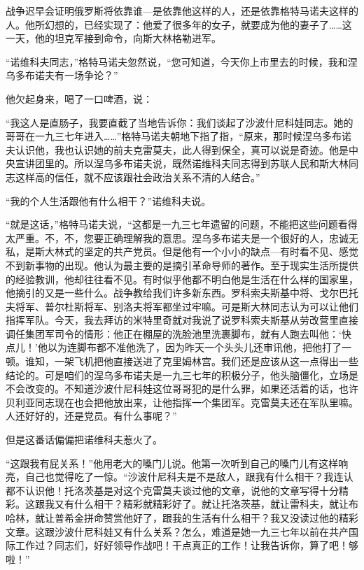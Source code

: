 战争迟早会证明俄罗斯将依靠谁—是依靠他这样的人，还是依靠格特马诺夫这样的人。他所幻想的，已经实现了：他爱了很多年的女子，就要成为他的妻子了……这一天，他的坦克军接到命令，向斯大林格勒进军。

“诺维科夫同志，”格特马诺夫忽然说，“您可知道，今天你上市里去的时候，我和涅乌多布诺夫有一场争论？”

他欠起身来，喝了一口啤酒，说：

“我这人是直肠子，我要直截了当地告诉你：我们谈起了沙波什尼科娃同志。她的哥哥在一九三七年进入……”格特马诺夫朝地下指了指，“原来，那时候涅乌多布诺夫认识他，我也认识她的前夫克雷莫夫，此人得到保全，真可以说是奇迹。他是中央宣讲团里的。所以涅乌多布诺夫说，既然诺维科夫同志得到苏联人民和斯大林同志这样高的信任，就不应该跟社会政治关系不清的人结合。”

“我的个人生活跟他有什么相干？”诺维科夫说。

“就是这话，”格特马诺夫说，“这都是一九三七年遗留的问题，不能把这些问题看得太严重。不，不，您要正确理解我的意思。涅乌多布诺夫是一个很好的人，忠诚无私，是斯大林式的坚定的共产党员。但是他有一个小小的缺点—有时看不见、感觉不到新事物的出现。他认为最主要的是摘引革命导师的著作。至于现实生活所提供的经验教训，他却往往看不见。有时似乎他都不明白他是生活在什么样的国家里，他摘引的又是一些什么。战争教给我们许多新东西。罗科索夫斯基中将、戈尔巴托夫将军、普尔杜斯将军、别洛夫将军都坐过牢嘛。可是斯大林同志认为可以让他们指挥军队。今天，我去拜访的米特里奇就对我说了说罗科索夫斯基从劳改营里直接调任集团军司令的情形：他正在棚屋的洗脸池里洗裹脚布，就有人跑去叫他：‘快点儿！’他以为连脚布都不准他洗了，因为昨天一个头头儿还审讯他，把他打了一顿。谁知，一架飞机把他直接送进了克里姆林宫。我们还是应该从这一点得出一些结论的。可是咱们的涅乌多布诺夫是一九三七年的积极分子，他头脑僵化，立场是不会改变的。不知道沙波什尼科娃这位哥哥犯的是什么罪，如果还活着的话，也许贝利亚同志现在也会把他放出来，让他指挥一个集团军。克雷莫夫还在军队里嘛。人还好好的，还是党员。有什么事呢？”

但是这番话偏偏把诺维科夫惹火了。

“这跟我有屁关系！”他用老大的嗓门儿说。他第一次听到自己的嗓门儿有这样响亮，自己也觉得吃了一惊。“沙波什尼科夫是不是敌人，跟我有什么相干？我连认都不认识他！托洛茨基是对这个克雷莫夫谈过他的文章，说他的文章写得十分精彩。这跟我又有什么相干？精彩就精彩好了。就让托洛茨基，就让雷科夫，就让布哈林，就让普希金拼命赞赏他好了，跟我的生活有什么相干？我又没读过他的精彩文章。这跟沙波什尼科娃又有什么关系？怎么，难道是她一九三七年以前在共产国际工作过？同志们，好好领导作战吧！干点真正的工作！让我告诉你，算了吧！够啦！”

